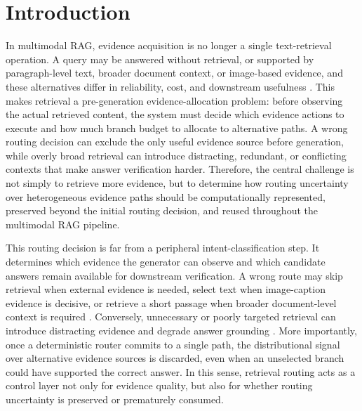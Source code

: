 \documentclass[a4paper,fleqn]{cas-dc}
\begin{document}
\maketitle

\section{Introduction}\label{sec:introduction}
In multimodal RAG, evidence acquisition is no longer a single text-retrieval operation. A query may be answered without retrieval, or supported by paragraph-level text, broader document context, or image-based evidence, and these alternatives differ in reliability, cost, and downstream usefulness \citep{Lewis2020RAG,Izacard2021Leveraging,Chen2022MuRAG,Hu2023Reveal,Wei2024UniIR,Faysse2025ColPali}. This makes retrieval a pre-generation evidence-allocation problem: before observing the actual retrieved content, the system must decide which evidence actions to execute and how much branch budget to allocate to alternative paths. A wrong routing decision can exclude the only useful evidence source before generation, while overly broad retrieval can introduce distracting, redundant, or conflicting contexts that make answer verification harder. Therefore, the central challenge is not simply to retrieve more evidence, but to determine how routing uncertainty over heterogeneous evidence paths should be computationally represented, preserved beyond the initial routing decision, and reused throughout the multimodal RAG pipeline.

This routing decision is far from a peripheral intent-classification step. It determines which evidence the generator can observe and which candidate answers remain available for downstream verification. A wrong route may skip retrieval when external evidence is needed, select text when image-caption evidence is decisive, or retrieve a short passage when broader document-level context is required \citep{Mallen2023Trust,Chang2022WebQA}. Conversely, unnecessary or poorly targeted retrieval can introduce distracting evidence and degrade answer grounding \citep{Shi2023Distracted}. More importantly, once a deterministic router commits to a single path, the distributional signal over alternative evidence sources is discarded, even when an unselected branch could have supported the correct answer. In this sense, retrieval routing acts as a control layer not only for evidence quality, but also for whether routing uncertainty is preserved or prematurely consumed.
\end{document}
